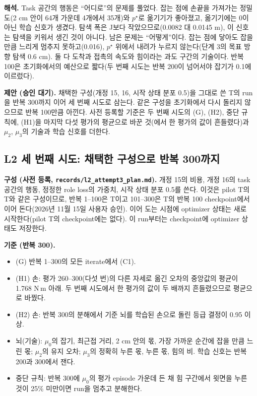 \documentclass[11pt]{article}\usepackage[margin=1in]{geometry}\usepackage{amsmath,amssymb,amsthm,mathtools}\usepackage{graphicx}\graphicspath{{figures/}{../figures/}{figs/}{./}}\usepackage{enumitem}\usepackage{hyperref}\usepackage{cleveref}\usepackage{tikz}\usetikzlibrary{arrows.meta,positioning,calc,shapes.geometric}\usepackage{float}\usepackage{rotating}\usepackage[most]{tcolorbox}\usepackage{kotex}\usepackage{booktabs}\usepackage{longtable}\emergencystretch=1.6em\tolerance=2000 \crefname{assumption}{Assumption}{Assumptions}\Crefname{assumption}{Assumption}{Assumptions}\crefname{definition}{Definition}{Definitions}\Crefname{definition}{Definition}{Definitions}\crefname{proposition}{Proposition}{Propositions}\Crefname{proposition}{Proposition}{Propositions}\crefname{fact}{Fact}{Facts}\Crefname{fact}{Fact}{Facts} \newtheorem{assumption}{Assumption}\newtheorem{definition}{Definition}\newtheorem{lemma}{Lemma}\newtheorem{proposition}{Proposition}\newtheorem{theorem}{Theorem}\newtheorem{corollary}{Corollary}\newtheorem{fact}{Fact}\theoremstyle{remark}\newtheorem{remark}{Remark} \newcommand{\R}{\mathbb{R}}\newcommand{\xb}{\bar x}\newcommand{\Ab}{\bar A}\newcommand{\By}{\bar B_y}\newcommand{\U}{\mathcal U}\newcommand{\Z}{\mathcal Z}
\begin{document}
\textbf{해석.} Task 공간의 행동은 ``어디로''의 문제를 풀었다. 잡는 점에 손끝을 가져가는 정밀도(2 cm 안이 64개 가운데 4개에서 35개)와 $p^\star$로 옮기기가 좋아졌고, 옮기기에는 0이 아닌 학습 신호가 생겼다. 탐색 폭은 J보다 작았으므로(0.0082 대 0.0145 m), 이 신호는 탐색을 키워서 생긴 것이 아니다. 남은 문제는 ``어떻게''이다. 잡는 점에 닿아도 잡을 만큼 느리게 멈추지 못하고(0.016), $p^\star$ 위에서 내려가 누르지 않는다(단계 3의 목표 방향 탐색 0.6 cm). 둘 다 도착과 접촉의 속도와 힘이라는 과도 구간의 기술이다. 반복 100은 초기화에서의 예산으로 짧다(두 번째 시도는 반복 200이 넘어서야 잡기가 0.1에 이르렀다).

\textbf{제안 (승인 대기).} 채택한 구성(개정 15, 16, 시작 상태 분포 0.5)을 그대로 쓴 T의 run을 반복 300까지 이어 세 번째 시도로 삼는다. 같은 구성을 초기화에서 다시 돌리지 않으므로 반복 100만큼 아낀다. 사전 등록할 기준은 두 번째 시도의 (G), (H2), 중단 규칙에, (H1)을 마지막 다섯 평가의 평균으로 바꾼 것(에서 한 평가의 값이 흔들렸다)과 $\mu_2$, $\mu_3$의 기술과 학습 신호를 더한다.

\subsection{L2 세 번째 시도: 채택한 구성으로 반복 300까지}
\label{sec:l2a3}

\textbf{구성 (사전 등록, \texttt{records/l2\_attempt3\_plan.md}).} 개정 15의 비용, 개정 16의 task 공간의 행동, 정정한 role loss의 가중치, 시작 상태 분포 0.5를 쓴다. 이것은 pilot T의 T와 같은 구성이므로, 반복 1--100은 T이고 101--300은 T의 반복 100 checkpoint에서 이어 돈다(2026년 11월 15일 사용자 승인). 이어 도는 시점에 optimizer 상태는 새로 시작한다(pilot T의 checkpoint에는 없다). 이 run부터는 checkpoint에 optimizer 상태도 저장한다.

\textbf{기준 (반복 300).}
\begin{itemize}
\item (G) 반복 1--300의 모든 iterate에서 (C1).
\item (H1) 손: 평가 260--300(다섯 번)의 다른 자세로 옮긴 오차의 중앙값의 평균이 1.768 N\,m 아래. 두 번째 시도에서 한 평가의 값이 두 배까지 흔들렸으므로 평균으로 바꿨다.
\item (H2) 손: 반복 300의 분해에서 기준 뇌를 학습된 손으로 돌린 등급 결정이 0.95 이상.
\item 뇌(기술): $\mu_0$의 잡기, 최근접 거리, 2 cm 안의 몫, 가장 가까운 순간에 잡을 만큼 느린 몫; $\mu_2$의 유지 오차; $\mu_3$의 정확히 누른 몫, 누른 몫, 힘의 비. 학습 신호는 반복 200과 300에서 잰다.
\item 중단 규칙: 반복 300에 $\mu_0$의 평가 episode 가운데 든 채 힘 구간에서 윗면을 누른 것이 25\% 미만이면 run을 멈추고 분해한다.
\end{itemize}
\end{document}
